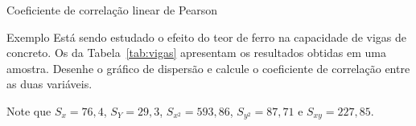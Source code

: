 \documentclass[9pt]{beamer}
\begin{document}
\begin{frame}{Coeficiente de correlação linear de Pearson}

\begin{block}{Exemplo}
	Está sendo estudado o efeito do teor de ferro na capacidade de vigas de concreto. Os da Tabela~\ref{tab:vigas} apresentam os resultados obtidas em uma amostra. Desenhe o gráfico de dispersão e calcule o coeficiente de correlação entre as duas variáveis.
	\begin{table}[ht]
		\centering
		\caption{Amostra com 10 vigas.} 
		\label{tab:vigas}
	\end{table}
	Note que $S_{x}= 76,4$, $S_{Y}=29,3$, $S_{x^2}=593,86$, $S_{y^2}=87,71$ e $S_{xy} = 227,85$.
\end{block}
\end{frame}
\end{document}
